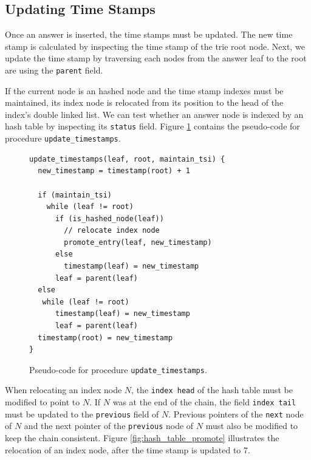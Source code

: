 \subsection{Updating Time Stamps}

Once an answer is inserted, the time stamps must be updated.
The new time stamp is calculated by inspecting the time stamp of the trie root node.
Next, we update the time stamp by traversing each nodes from the answer leaf to the root are using the \texttt{parent} field.

If the current node is an hashed node and the time stamp indexes
must be maintained, its index node is relocated from its position to the head of
the index's double linked list. We can test whether an answer node is indexed by
an hash table by inspecting its \texttt{status} field.
Figure \ref{fig:update_timestamps} contains the pseudo-code for procedure \texttt{update\_timestamps}.

\begin{figure}[ht]
\begin{Verbatim}
update_timestamps(leaf, root, maintain_tsi) {
  new_timestamp = timestamp(root) + 1
  
  if (maintain_tsi)
    while (leaf != root)
      if (is_hashed_node(leaf))
        // relocate index node
        promote_entry(leaf, new_timestamp)
      else
        timestamp(leaf) = new_timestamp
      leaf = parent(leaf)
  else
   while (leaf != root)
      timestamp(leaf) = new_timestamp
      leaf = parent(leaf)
  timestamp(root) = new_timestamp
}
\end{Verbatim}
\caption{Pseudo-code for procedure \texttt{update\_timestamps}.}
\label{fig:update_timestamps}
\end{figure}

When relocating an index node $N$, the \texttt{index head} of the hash table must be modified
to point to $N$. If $N$ was at the end of the chain,
the field \texttt{index tail} must be updated to the \texttt{previous} field of $N$.
Previous pointers of the \texttt{next} node of $N$ and the next pointer of
the \texttt{previous} node of $N$ must
also be modified to keep the chain consistent.
Figure \ref{fig:hash_table_promote} illustrates the relocation of an index node, after
the time stamp is updated to 7.

